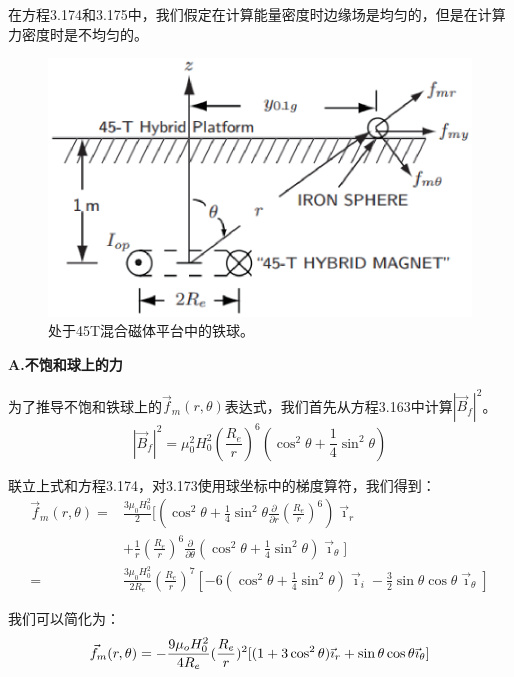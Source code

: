 在方程3.174和3.175中，我们假定在计算能量密度时边缘场是均匀的，但是在计算力密度时是不均匀的。
\begin{figure}[htbp]
	\centering
	\includegraphics[scale=0.5]{chpt3/figs/fig3.46.eps}
	\caption{处于45T混合磁体平台中的铁球。}
\end{figure}

\textbf{A.不饱和球上的力}

为了推导不饱和铁球上的$\vec{f}_{m}(r,\theta)$表达式，我们首先从方程3.163中计算$|\vec{B}_f|^2$。
\begin{equation*}
|\vec{B}_f|^2=\mu_0^2 H_0^2\left(\frac{R_e}{r}\right)^6(\cos^2\theta+\frac{1}{4}\sin^2\theta)
\end{equation*}

联立上式和方程3.174，对3.173使用球坐标中的梯度算符，我们得到：
\begin{equation*}
\begin{split}
\vec{f}_{m}(r,\theta)=&\frac{3\mu_0 H_0^2}{2}\bigg[(\cos^2\theta+\frac{1}{4}\sin^2\theta\frac{\partial}{\partial r}(\frac{R_e}{r})^6)\vec{\imath}_r\\
&+\frac{1}{r}(\frac{R_e}{r})^6\frac{\partial}{\partial \theta}(\cos^2\theta+\frac{1}{4}\sin^2\theta)\vec{\imath}_\theta\bigg]\\
=&\frac{3\mu_0 H_0^2}{2R_e}(\frac{R_e}{r})^7\left[-6(\cos^2\theta+\frac{1}{4}\sin^2\theta)\vec{\imath}_i-\frac{3}{2}\sin\theta\cos\theta\vec{\imath}_\theta\right]
\end{split}
\end{equation*}

我们可以简化为：
\begin{equation}
\vec{f}_{m}(r,\theta)=-\frac{9\mu_{o}H_{0}^{2}}{4R_{e}}(\frac{R_{e}}{r})^{2}[(1+3\cos^{2}\theta)\vec{\imath}_{r}+\sin\theta\cos\theta\vec{\imath}_{\theta}]\\%
\end{equation}

